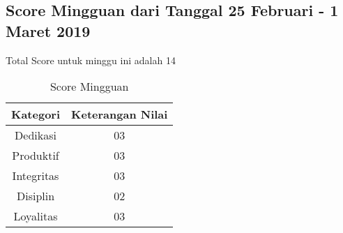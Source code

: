 \subsection{Score Mingguan dari Tanggal 25 Februari - 1 Maret 2019}
Total Score untuk minggu ini adalah 14

\begin{table}[h]
\caption{Score Mingguan}
\centering
\begin{tabular}{|c|c|}
\hline
\textbf{Kategori}&\textbf{Keterangan Nilai}\\
\hline
Dedikasi&03\\
\hline
Produktif&03\\
\hline
Integritas&03\\
\hline
Disiplin&02\\
\hline
Loyalitas&03\\
\hline
\end{tabular}
\label{table:score mingguan}
\end{table}







